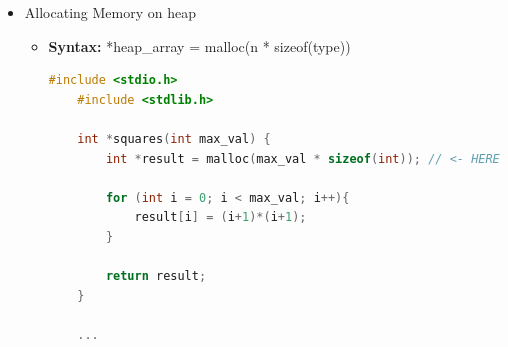 \documentclass[12pt]{article}
\begin{document}
\bigskip

\begin{itemize}
    \item Allocating Memory on heap
    \begin{itemize}
        \item \textbf{Syntax:} *heap\_array = malloc(n * sizeof(type))

    \begin{lstlisting}[language=c,caption={dynamic\_mem\_example\_2.c}]
    #include <stdio.h>
    #include <stdlib.h>

    int *squares(int max_val) {
        int *result = malloc(max_val * sizeof(int)); // <- HERE :)

        for (int i = 0; i < max_val; i++){
            result[i] = (i+1)*(i+1);
        }

        return result;
    }

    ...
    \end{lstlisting}
    \end{itemize}
\end{itemize}
\end{document}
